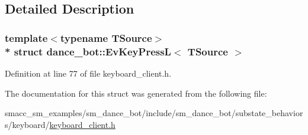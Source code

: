 \subsection{Detailed Description}
\subsubsection*{template$<$typename T\+Source$>$\\*
struct dance\+\_\+bot\+::\+Ev\+Key\+Press\+L$<$ T\+Source $>$}



Definition at line 77 of file keyboard\+\_\+client.\+h.



The documentation for this struct was generated from the following file\+:\begin{DoxyCompactItemize}
\item 
smacc\+\_\+sm\+\_\+examples/sm\+\_\+dance\+\_\+bot/include/sm\+\_\+dance\+\_\+bot/substate\+\_\+behaviors/keyboard/\hyperlink{keyboard__client_8h}{keyboard\+\_\+client.\+h}\end{DoxyCompactItemize}
